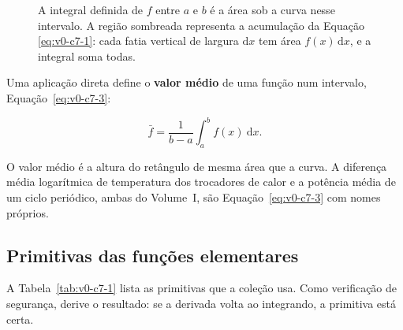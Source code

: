 \documentclass[12pt,a4paper]{article}
\numberwithin{equation}{section}
\numberwithin{table}{section}
\numberwithin{figure}{section}
\begin{document}
\begin{figure}[H]
\centering
{}
\caption[A integral definida como área sob a curva.]{%
A integral definida de $f$ entre $a$ e $b$ é a área sob a curva nesse
intervalo. A região sombreada representa a acumulação da Equação
\eqref{eq:v0-c7-1}: cada fatia vertical de largura $\mathrm{d}x$ tem área
$f(x)\,\mathrm{d}x$, e a integral soma todas.}
\label{fig:v0-c7-1}
\end{figure}

Uma aplicação direta define o \textbf{valor médio} de uma função num
intervalo, Equação~\eqref{eq:v0-c7-3}:

\begin{equation}\label{eq:v0-c7-3}
\bar{f} = \frac{1}{b-a}\int_{a}^{b} f(x)\ \mathrm{d}x.
\end{equation}

O valor médio é a altura do retângulo de mesma área que a curva. A
diferença média logarítmica de temperatura dos trocadores de calor e a
potência média de um ciclo periódico, ambas do Volume~I, são
Equação~\eqref{eq:v0-c7-3} com nomes próprios.

\subsection{Primitivas das funções elementares}

A Tabela~\ref{tab:v0-c7-1} lista as primitivas que a coleção usa. Como
verificação de segurança, derive o resultado: se a derivada volta ao
integrando, a primitiva está certa.
\end{document}
